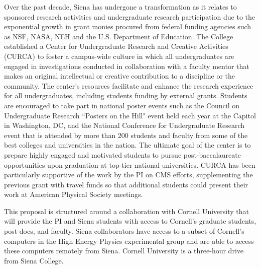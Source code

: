 \documentclass[11pt]{article}
\begin{document}
Over the past decade, Siena has undergone a transformation as it relates to sponsored research activities and 
undergraduate research participation due to the exponential growth in grant monies procured from federal funding agencies 
such as NSF, NASA, NEH and the U.S. Department of Education.  The College established a Center for 
Undergraduate Research and Creative Activities (CURCA) to foster a campus-wide culture in which all undergraduates are engaged in 
investigations conducted in collaboration with a faculty mentor that makes an original intellectual or creative contribution 
to a discipline or the community. The center's resources facilitate and enhance the research experience for all undergraduates, 
including students funding by external grants. Students are encouraged to take part in national poster events such as the 
Council on Undergraduate Research ``Posters on the Hill" event held each year at the Capitol in Washington, DC, and the 
National Conference for Undergraduate Research event that is attended by more than 200 students and faculty from some of 
the best colleges and universities in the nation. The ultimate goal of the center is to prepare highly engaged and 
motivated students to pursue post-baccalaureate opportunities upon graduation at top-tier national universities. 
CURCA has been particularly supportive of the work by the PI on CMS efforts, supplementing 
the previous grant with travel funds so that additional students could present their work at 
American Physical Society meetings.

This proposal is structured around a collaboration with Cornell University that will 
provide the PI and Siena students with access to Cornell's graduate students,
post-docs, and faculty. Siena collaborators have access to a subset of
Cornell's computers in the High Energy Physics experimental group and are
able to access these computers remotely from Siena.
Cornell University is a three-hour drive from Siena College.
\end{document}
